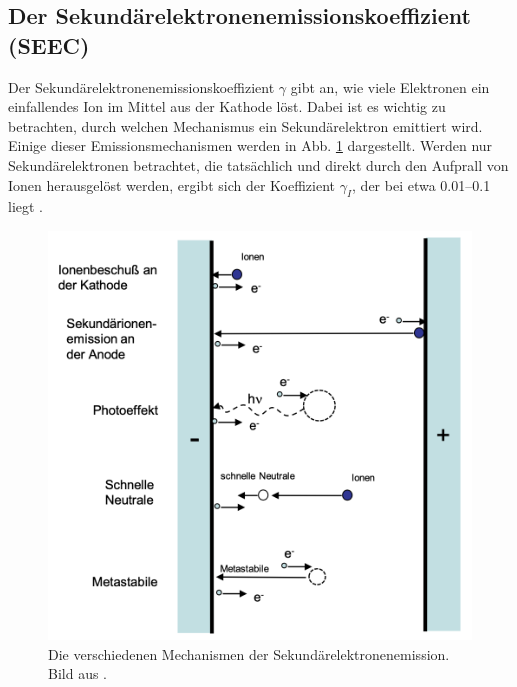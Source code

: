 \subsection{Der Sekundärelektronenemissionskoeffizient (SEEC)}
Der Sekundärelektronenemissionskoeffizient $ \gamma $ gibt an, wie viele Elektronen ein einfallendes Ion im Mittel aus der Kathode löst. Dabei ist es wichtig zu betrachten, durch welchen Mechanismus ein Sekundärelektron emittiert wird. Einige dieser Emissionsmechanismen werden in Abb. \ref{fig:see} dargestellt. Werden nur Sekundärelektronen betrachtet, die tatsächlich und direkt durch den Aufprall von Ionen herausgelöst werden, ergibt sich der Koeffizient $ \gamma_I $, der bei etwa \numrange{0,01}{0,1} liegt \cite{mariottiExperimentalStudyBreakdown2004}. 
\begin{figure}[h]
	\centering
	\includegraphics[width=0.7\linewidth]{bilder/see}
	\caption{Die verschiedenen Mechanismen der Sekundärelektronenemission. Bild aus \cite{keudellVorlesungsskriptEinfuhrungPlasmaphysik2010}.}
	\label{fig:see}
\end{figure}

